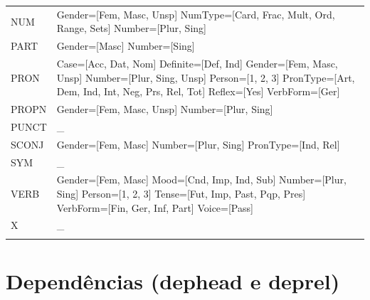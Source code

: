 \documentclass[output=paper,colorlinks,citecolor=brown]{langscibook}
\begin{document}
\begin{longtable}{ p{1.5cm} | p{10cm} }
		NUM & Gender=[Fem, Masc, Unsp] \newline NumType=[Card, Frac, Mult, Ord, Range, Sets] \newline Number=[Plur, Sing] \newline \\
		PART & Gender=[Masc] \newline Number=[Sing] \newline \\
		PRON & Case=[Acc, Dat, Nom] \newline Definite=[Def, Ind] \newline Gender=[Fem, Masc, Unsp] \newline Number=[Plur, Sing, Unsp] \newline Person=[1, 2, 3] \newline PronType=[Art, Dem, Ind, Int, Neg, Prs, Rel, Tot] \newline Reflex=[Yes] \newline VerbForm=[Ger] \newline \\
		PROPN & Gender=[Fem, Masc, Unsp] \newline Number=[Plur, Sing] \newline \\
		PUNCT & \_ \newline\\
		SCONJ & Gender=[Fem, Masc] \newline Number=[Plur, Sing] \newline PronType=[Ind, Rel] \newline \\
		SYM & \_ \newline\\
		VERB & Gender=[Fem, Masc] \newline Mood=[Cnd, Imp, Ind, Sub] \newline Number=[Plur, Sing] \newline Person=[1, 2, 3] \newline Tense=[Fut, Imp, Past, Pqp, Pres] \newline VerbForm=[Fin, Ger, Inf, Part] \newline Voice=[Pass] \newline \\
		X & \_ \\
		
		\label{tab:feats}
	\end{longtable}

\chapter{Dependências (dephead e deprel)}
\end{document}
